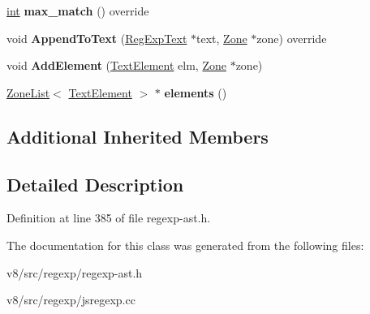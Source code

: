 \begin{DoxyCompactItemize}
\item 
\mbox{\label{classv8_1_1internal_1_1RegExpText_ac6e7ca99e8d7dc54bbd1b205953d2c52}} 
\mbox{\hyperlink{classint}{int}} {\bfseries max\+\_\+match} () override
\item 
\mbox{\label{classv8_1_1internal_1_1RegExpText_a08e5bd7d0143a9b18a96cb99e0fac798}} 
void {\bfseries Append\+To\+Text} (\mbox{\hyperlink{classv8_1_1internal_1_1RegExpText}{Reg\+Exp\+Text}} $\ast$text, \mbox{\hyperlink{classv8_1_1internal_1_1Zone}{Zone}} $\ast$zone) override
\item 
\mbox{\label{classv8_1_1internal_1_1RegExpText_a712a212b61a1885e17e905724731a233}} 
void {\bfseries Add\+Element} (\mbox{\hyperlink{classv8_1_1internal_1_1TextElement}{Text\+Element}} elm, \mbox{\hyperlink{classv8_1_1internal_1_1Zone}{Zone}} $\ast$zone)
\item 
\mbox{\label{classv8_1_1internal_1_1RegExpText_a54dc3a5be0ef2e6447e154e594f3c779}} 
\mbox{\hyperlink{classv8_1_1internal_1_1ZoneList}{Zone\+List}}$<$ \mbox{\hyperlink{classv8_1_1internal_1_1TextElement}{Text\+Element}} $>$ $\ast$ {\bfseries elements} ()
\end{DoxyCompactItemize}
\subsection*{Additional Inherited Members}


\subsection{Detailed Description}


Definition at line 385 of file regexp-\/ast.\+h.



The documentation for this class was generated from the following files\+:\begin{DoxyCompactItemize}
\item 
v8/src/regexp/regexp-\/ast.\+h\item 
v8/src/regexp/jsregexp.\+cc\end{DoxyCompactItemize}
